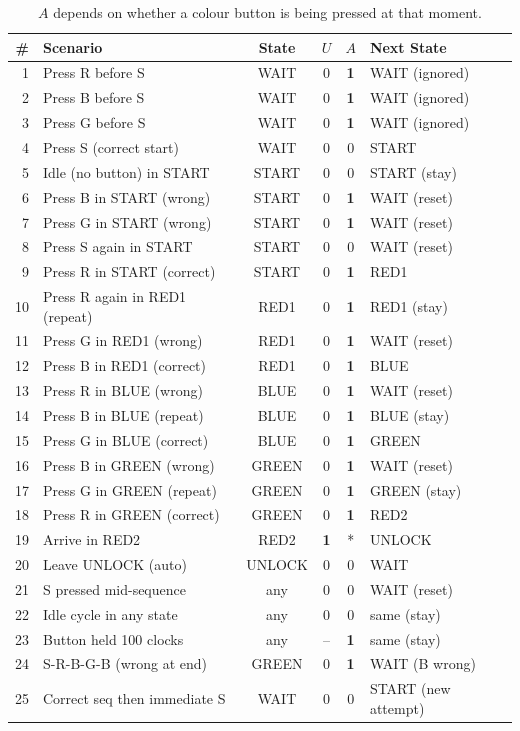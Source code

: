 \documentclass[12pt,a4paper]{article}
\begin{document}
\begin{table}[H]
\centering
\small
\caption{All Edge-Case Scenarios}
\begin{tabular}{r p{4.8cm} c c c p{3.2cm}}
\toprule
\# & \textbf{Scenario} & \textbf{State} & $U$ & $A$ & \textbf{Next State} \\
\midrule
1 & Press R before S & WAIT & 0 & \textbf{1} & WAIT (ignored) \\
2 & Press B before S & WAIT & 0 & \textbf{1} & WAIT (ignored) \\
3 & Press G before S & WAIT & 0 & \textbf{1} & WAIT (ignored) \\
4 & Press S (correct start) & WAIT & 0 & 0 & START \\
5 & Idle (no button) in START & START & 0 & 0 & START (stay) \\
6 & Press B in START (wrong) & START & 0 & \textbf{1} & WAIT (reset) \\
7 & Press G in START (wrong) & START & 0 & \textbf{1} & WAIT (reset) \\
8 & Press S again in START & START & 0 & 0 & WAIT (reset) \\
9 & Press R in START (correct) & START & 0 & \textbf{1} & RED1 \\
10 & Press R again in RED1 (repeat) & RED1 & 0 & \textbf{1} & RED1 (stay) \\
11 & Press G in RED1 (wrong) & RED1 & 0 & \textbf{1} & WAIT (reset) \\
12 & Press B in RED1 (correct) & RED1 & 0 & \textbf{1} & BLUE \\
13 & Press R in BLUE (wrong) & BLUE & 0 & \textbf{1} & WAIT (reset) \\
14 & Press B in BLUE (repeat) & BLUE & 0 & \textbf{1} & BLUE (stay) \\
15 & Press G in BLUE (correct) & BLUE & 0 & \textbf{1} & GREEN \\
16 & Press B in GREEN (wrong) & GREEN & 0 & \textbf{1} & WAIT (reset) \\
17 & Press G in GREEN (repeat) & GREEN & 0 & \textbf{1} & GREEN (stay) \\
18 & Press R in GREEN (correct) & GREEN & 0 & \textbf{1} & RED2 \\
19 & Arrive in RED2 & RED2 & \textbf{1} & * & UNLOCK \\
20 & Leave UNLOCK (auto) & UNLOCK & 0 & 0 & WAIT \\
21 & S pressed mid-sequence & any & 0 & 0 & WAIT (reset) \\
22 & Idle cycle in any state & any & 0 & 0 & same (stay) \\
23 & Button held 100 clocks & any & -- & \textbf{1} & same (stay) \\
24 & S-R-B-G-B (wrong at end) & GREEN & 0 & \textbf{1} & WAIT (B wrong) \\
25 & Correct seq then immediate S & WAIT & 0 & 0 & START (new attempt) \\
\bottomrule
\end{tabular}
\caption*{\small * $A$ depends on whether a colour button is being pressed at that moment.}
\end{table}
\end{document}
